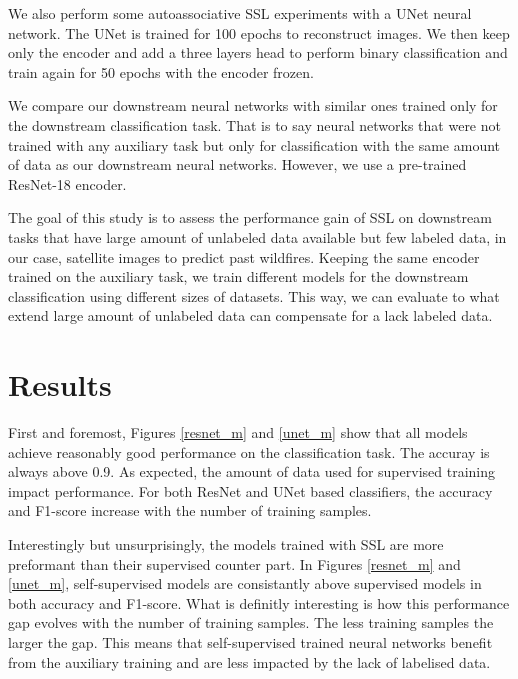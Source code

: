 \documentclass{article}
\begin{document}
We also perform some autoassociative SSL experiments with a UNet neural network. The UNet is trained for 100 epochs to reconstruct images. We then keep only the encoder and add a three layers head to perform binary classification and train again for 50 epochs with the encoder frozen.

We compare our downstream neural networks with similar ones trained only for the downstream classification task. That is to say neural networks that were not trained with any auxiliary task but only for classification with the same amount of data as our downstream neural networks. However, we use a pre-trained ResNet-18 encoder.

The goal of this study is to assess the performance gain of SSL on downstream tasks that have large amount of unlabeled data available but few labeled data, in our case, satellite images to predict past wildfires. Keeping the same encoder trained on the auxiliary task, we train different models for the downstream classification using different sizes of datasets. This way, we can evaluate to what extend large amount of unlabeled data can compensate for a lack labeled data.

\section{Results}
First and foremost, Figures \ref{resnet_m} and \ref{unet_m} show that all models achieve reasonably good performance on the classification task. The accuray is always above 0.9. As expected, the amount of data used for supervised training impact performance. For both ResNet and UNet based classifiers, the accuracy and F1-score increase with the number of training samples.

Interestingly but unsurprisingly, the models trained with SSL are more preformant than their supervised counter part. In Figures \ref{resnet_m} and \ref{unet_m}, self-supervised models are consistantly above supervised models in both accuracy and F1-score. What is definitly interesting is how this performance gap evolves with the number of training samples. The less training samples the larger the gap. This means that self-supervised trained neural networks benefit from the auxiliary training and are less impacted by the lack of labelised data.
\end{document}
